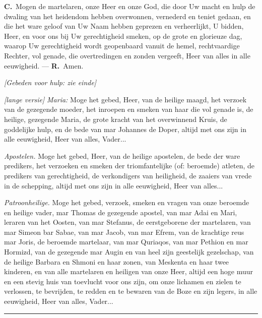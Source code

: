 \documentclass[12pt,twoside,a5paper]{article}
\newlength{\origparskip}
\newenvironment{halfparskip}{
  \setlength{\parskip}{0.5\origparskip}
}{
  \setlength{\parskip}{\origparskip}
}
\newcommand{\cc}{{\color{BrickRed} \textbf{C.}}}
\newcommand{\rr}{{\color{BrickRed} \textbf{R.}}}
\newcommand{\liturgicalhint}[1]{{\color{BrickRed}\footnotesize\itshape{#1}}}
\begin{document}
\begin{halfparskip}
  \cc\ Mogen de martelaren, onze Heer en onze God, die door Uw macht en hulp de dwaling van het heidendom hebben overwonnen, vernederd en teniet gedaan, en die het ware geloof van Uw Naam hebben geprezen en verheerlijkt, U bidden, Heer, en voor ons bij Uw gerechtigheid smeken, op de grote en glorieuze dag, waarop Uw gerechtigheid wordt geopenbaard vanuit de hemel, rechtvaardige Rechter, vol genade, die overtredingen en zonden vergeeft, Heer van alles in alle eeuwigheid. --- \rr\ Amen.
\end{halfparskip}

\begin{halfparskip}
  \liturgicalhint{[Gebeden voor hulp: zie einde]}

  \liturgicalhint{[lange versie]} \liturgicalhint{Maria:} Moge het gebed, Heer, van de heilige maagd, het verzoek van de gezegende moeder, het inroepen en smeken van haar die vol genade is, de heilige, gezegende Maria, de grote kracht van het overwinnend Kruis, de goddelijke hulp, en de bede van mar Johannes de Doper, altijd met ons zijn in alle eeuwigheid, Heer van alles, Vader...

  \liturgicalhint{Apostelen.} Moge het gebed, Heer, van de heilige apostelen, de bede der ware predikers, het verzoeken en smeken der triomfantelijke (of: beroemde) atleten, de predikers van gerechtigheid, de verkondigers van heiligheid, de zaaiers van vrede in de schepping, altijd met ons zijn in alle eeuwigheid, Heer van alles...

  \liturgicalhint{Patroonheilige.} Moge het gebed, verzoek, smeken en vragen van onze beroemde en heilige vader, mar Thomas de gezegende apostel, van mar Adai en Mari, leraren van het Oosten, van mar Stefanus, de eerstgeborene der martelaren, van mar Simeon bar Sabae, van mar Jacob, van mar Efrem, van de krachtige reus mar Joris, de beroemde martelaar, van mar Quriaqos, van mar Pethion en mar Hormizd, van de gezegende mar Augin en van heel zijn geestelijk gezelschap, van de heilige Barbara en Shmoni en haar zonen, van Meskenta en haar twee kinderen, en van alle martelaren en heiligen van onze Heer, altijd een hoge muur en een stevig huis van toevlucht voor ons zijn, om onze lichamen en zielen te verlossen, te bevrijden, te redden en te bewaren van de Boze en zijn legers, in alle eeuwigheid, Heer van alles, Vader...
\end{halfparskip}

\noindent\rule{\textwidth}{0.5pt}
\end{document}
